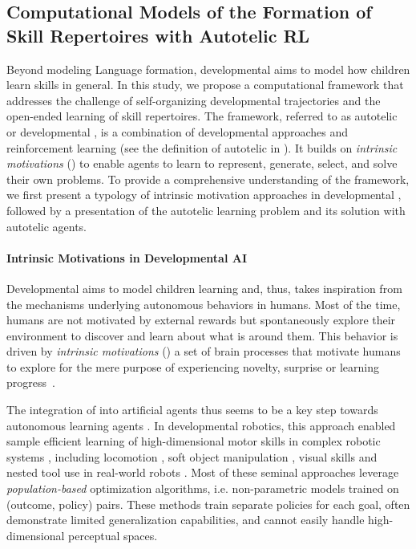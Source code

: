 \subsection{Computational Models of the Formation of Skill Repertoires with Autotelic RL}
\label{sec:self-orga-traj-context}
Beyond modeling Language formation, developmental \ai aims to model how children learn skills in general. In this study, we propose a computational framework that addresses the challenge of self-organizing developmental trajectories and the open-ended learning of skill repertoires. The framework, referred to as autotelic \rl or developmental \rl, is a combination of developmental approaches and reinforcement learning (see the definition of autotelic in ).  It builds on \textit{intrinsic motivations} (\ims) to enable agents to learn to represent, generate, select, and solve their own problems. To provide a comprehensive understanding of the framework, we first present a typology of intrinsic motivation approaches in developmental \ai, followed by a presentation of the autotelic learning problem and its solution with autotelic agents.
\paragraph{Intrinsic Motivations in Developmental AI}

 Developmental \ai aims to model children learning and, thus, takes inspiration from the mechanisms underlying autonomous behaviors in humans. Most of the time, humans are not motivated by external rewards but spontaneously explore their environment to discover and learn about what is around them. This behavior is driven by \textit{intrinsic motivations} (\ims) a set of brain processes that motivate humans to explore for the mere purpose of experiencing novelty, surprise or learning progress~\citep{berlyne1966curiosity,gopnik1999scientist,kidd2015psychology,oudeyer2016evolution,gottlieb2018towards}. 
 
 The integration of \ims into artificial agents thus seems to be a key step towards autonomous learning agents \citep{schmidhuber1991possibility,kaplan2007search}. In developmental robotics, this approach enabled sample efficient learning of high-dimensional motor skills in complex robotic systems \citep{santucci2020intrinsically}, including locomotion \citep{baranes2013active,martius2013information}, soft object manipulation \citep{rolf2013efficient,nguyen2014socially}, visual skills \citep{lonini2013robust} and nested tool use in real-world robots \citep{imgep}. Most of these seminal approaches leverage \textit{population-based} optimization algorithms, i.e. non-parametric models trained on (outcome, policy) pairs. These methods train separate policies for each goal, often demonstrate limited generalization capabilities, and cannot easily handle high-dimensional perceptual spaces.

